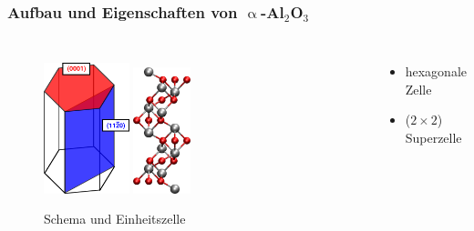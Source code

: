 \documentclass[hyperref={pdfpagelabels=false}]{beamer}
\begin{document}
\begin{frame}
 \frametitle{Aufbau und Eigenschaften von $\upalpha$-Al$_2$O$_3$}
 \begin{columns}
  \begin{figure}
  \centering
  \includegraphics[width=0.3\textwidth]{figures/al2o3-crystal.png}
  \includegraphics[width=0.2\textwidth]{figures/bulk_UC.jpg}
  \caption{Schema und Einheitszelle}
  \end{figure}
  \begin{itemize}
  \item hexagonale Zelle
  \item ($2\times 2$) Superzelle
  \end{itemize}
 \end{columns}
 \pause
 \vspace{-.3cm}
\begin{columns}
  \begin{figure}

\end{figure}
\end{columns}
\end{frame}
\end{document}
